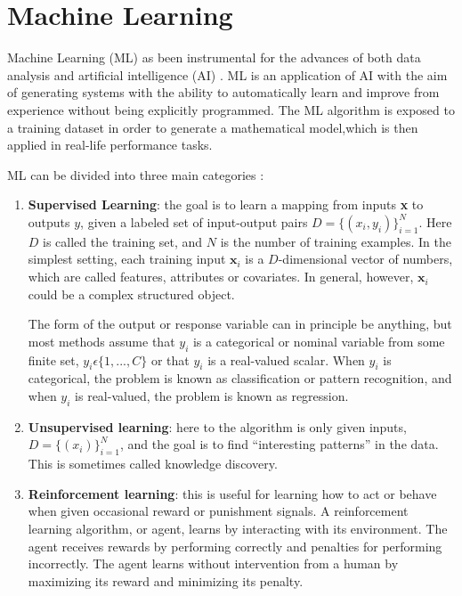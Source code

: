 \documentclass[a4paper, oneside]{book}
\begin{document}
		
		
	\chapter{Machine Learning}
		Machine Learning (ML) as been instrumental for the advances of both data analysis and artificial intelligence (AI) \cite{Lifelong ML}. ML is an application of AI with the aim of generating systems with the ability to automatically learn and improve from experience without being explicitly programmed. The ML algorithm is exposed to a training dataset in order to generate a mathematical model,which is then applied in real-life performance tasks. %
		
		ML can be divided into three main categories \cite{ML categories}:
		\begin{enumerate}
			\item \textbf{Supervised Learning}: the goal is to learn a mapping from inputs \textbf{x} to outputs $y$, given a labeled set of input-output pairs $D = \{(x_i, y_i)\}_{i=1}^{N}$. Here $D$ is called the training set, and $N$ is the number of training examples. In the simplest setting, each training input $\textbf{x}_i$ is a $D$-dimensional vector of numbers, which are called features, attributes or covariates. In general, however, $\textbf{x}_i$ could be a complex structured object.
			
			The form of the output or response variable can in principle be anything, but most methods assume that $y_i$ is a categorical or nominal variable from some finite set, $y_i \epsilon  \{1, . . . , C\}$ or that $y_i$ is a real-valued scalar. When $y_i$ is categorical, the problem is known as classification or pattern recognition, and when $y_i$ is real-valued, the problem is known as regression.
			
			\item \textbf{Unsupervised learning}: here to the algorithm is only given inputs, $D = \{(x_i)\}_{i=1}^{N}$, and the goal is to find “interesting patterns” in the data. This is sometimes called knowledge discovery. %
			
			\item \textbf{Reinforcement learning}: this is useful for learning how to act or behave when given occasional reward or punishment signals. A reinforcement learning algorithm, or agent, learns by interacting with its environment. The agent receives rewards by performing correctly and penalties for performing incorrectly. The agent learns without intervention from a human by maximizing its reward and minimizing its penalty.
			
		\end{enumerate}
\end{document}
